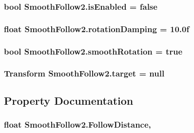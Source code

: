 \subsubsection[{\texorpdfstring{is\+Enabled}{isEnabled}}]{\setlength{\rightskip}{0pt plus 5cm}bool Smooth\+Follow2.\+is\+Enabled = false}\hypertarget{class_smooth_follow2_a7cd7664186365e7e3107ca00c4c04682}{}\label{class_smooth_follow2_a7cd7664186365e7e3107ca00c4c04682}
\subsubsection[{\texorpdfstring{rotation\+Damping}{rotationDamping}}]{\setlength{\rightskip}{0pt plus 5cm}float Smooth\+Follow2.\+rotation\+Damping = 10.\+0f}\hypertarget{class_smooth_follow2_a62e856074bb0dd5cbc115d41c4e5a53b}{}\label{class_smooth_follow2_a62e856074bb0dd5cbc115d41c4e5a53b}
\subsubsection[{\texorpdfstring{smooth\+Rotation}{smoothRotation}}]{\setlength{\rightskip}{0pt plus 5cm}bool Smooth\+Follow2.\+smooth\+Rotation = true}\hypertarget{class_smooth_follow2_afa5c565b89261e8fac01598585061789}{}\label{class_smooth_follow2_afa5c565b89261e8fac01598585061789}
\subsubsection[{\texorpdfstring{target}{target}}]{\setlength{\rightskip}{0pt plus 5cm}Transform Smooth\+Follow2.\+target = null}\hypertarget{class_smooth_follow2_a947df33a0028c7a23c05aa78821d78a0}{}\label{class_smooth_follow2_a947df33a0028c7a23c05aa78821d78a0}


\subsection{Property Documentation}
\subsubsection[{\texorpdfstring{Follow\+Distance}{FollowDistance}}]{\setlength{\rightskip}{0pt plus 5cm}float Smooth\+Follow2.\+Follow\+Distance\hspace{0.3cm}{\ttfamily [get]}, {\ttfamily [set]}}\hypertarget{class_smooth_follow2_ad14c1513f7c661c78175ee5b5b2b0e3c}{}\label{class_smooth_follow2_ad14c1513f7c661c78175ee5b5b2b0e3c}
